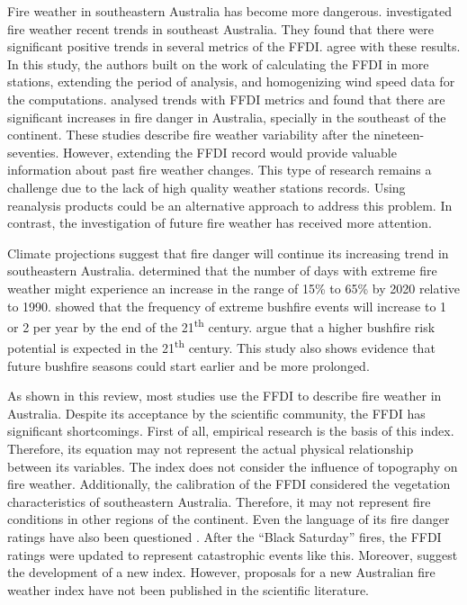 Fire weather in southeastern Australia has become more dangerous.
\citet{Lucas2007} investigated fire weather recent trends in southeast
Australia. They found that there were significant positive trends
in several metrics of the FFDI. \citet{Clarke2013} agree with these
results. In this study, the authors built on the work of \citet{Lucas2010}
calculating the FFDI in more stations, extending the period of analysis,
and homogenizing wind speed data for the computations. \citet{Clarke2013}
analysed trends with FFDI metrics and found that there are significant
increases in fire danger in Australia, specially in the
southeast of the continent. These studies describe fire
weather variability after the nineteen-seventies. However, extending
the FFDI record would provide valuable information about past fire
weather changes. This type of research remains a challenge due to
the lack of high quality weather stations records. Using reanalysis products could
be an alternative approach to address this problem. In contrast, the
investigation of future fire weather has received more attention.

Climate projections suggest that fire danger will continue its increasing
trend in southeastern Australia. \citet{Lucas2007} determined that
the number of days with extreme fire weather might experience an increase
in the range of 15\% to 65\% by 2020 relative to 1990. \citet{Hasson2009} showed that
the frequency of extreme bushfire events will increase to 1 or 2 per
year by the end of the 21\textsuperscript{th} century. \citet{Clarke2011}
argue that a higher bushfire risk potential is expected in the 21\textsuperscript{th }century.
This study also shows evidence that future bushfire seasons could
start earlier and be more prolonged. 

As shown in this review, most studies use the FFDI to describe fire
weather in Australia. Despite its acceptance by the scientific community,
the FFDI has significant shortcomings. First of all, empirical research
is the basis of this index. Therefore, its equation may not represent
the actual physical relationship between its variables. The index
does not consider the influence of topography on fire weather. Additionally,
the calibration of the FFDI considered the vegetation characteristics
of southeastern Australia. Therefore, it may not represent fire conditions
in other regions of the continent. Even the language of its fire danger
ratings have also been questioned \citep{Teague2010}. After the ``Black
Saturday'' fires, the FFDI ratings were updated to represent catastrophic
events like this. Moreover, \citet{Teague2010} suggest the development
of a new index. However, proposals for a new Australian fire weather
index have not been published in the scientific literature. 

